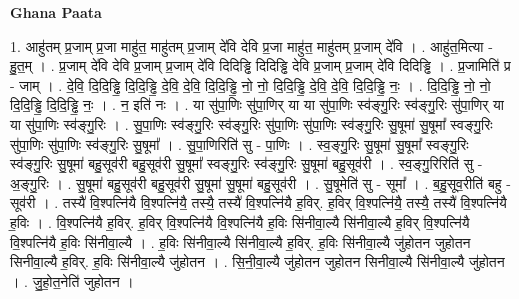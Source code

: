 \documentclass[17pt]{extarticle}
\begin{document}
\textbf{Ghana Paata } \newline

1. आहु॑तम् प्र॒जाम् प्र॒जा माहु॑त॒ माहु॑तम् प्र॒जाम् दे॑वि देवि प्र॒जा माहु॑त॒ माहु॑तम् प्र॒जाम् दे॑वि । . आहु॑त॒मित्या - हु॒त॒म् । . प्र॒जाम् दे॑वि देवि प्र॒जाम् प्र॒जाम् दे॑वि दिदिड्ढि दिदिड्ढि देवि प्र॒जाम् प्र॒जाम् दे॑वि दिदिड्ढि । . प्र॒जामिति॑ प्र - जाम् । . दे॒वि॒ दि॒दि॒ड्ढि॒ दि॒दि॒ड्ढि॒ दे॒वि॒ दे॒वि॒ दि॒दि॒ड्ढि॒ नो॒ नो॒ दि॒दि॒ड्ढि॒ दे॒वि॒ दे॒वि॒ दि॒दि॒ड्ढि॒ नः॒ । . दि॒दि॒ड्ढि॒ नो॒ नो॒ दि॒दि॒ड्ढि॒ दि॒दि॒ड्ढि॒ नः॒ । . न॒ इति॑ नः । . या सु॑पा॒णिः सु॑पा॒णिर् या या सु॑पा॒णिः स्व॑ङ्गु॒रिः स्व॑ङ्गु॒रिः सु॑पा॒णिर् या या सु॑पा॒णिः स्व॑ङ्गु॒रिः । . सु॒पा॒णिः स्व॑ङ्गु॒रिः स्व॑ङ्गु॒रिः सु॑पा॒णिः सु॑पा॒णिः स्व॑ङ्गु॒रिः सु॒षूमा॑ सु॒षूमा᳚ स्वङ्गु॒रिः सु॑पा॒णिः सु॑पा॒णिः स्व॑ङ्गु॒रिः सु॒षूमा᳚ । . सु॒पा॒णिरिति॑ सु - पा॒णिः । . स्व॒ङ्गु॒रिः सु॒षूमा॑ सु॒षूमा᳚ स्वङ्गु॒रिः स्व॑ङ्गु॒रिः सु॒षूमा॑ बहु॒सूव॑री बहु॒सूव॑री सु॒षूमा᳚ स्वङ्गु॒रिः स्व॑ङ्गु॒रिः सु॒षूमा॑ बहु॒सूव॑री । . स्व॒ङ्गु॒रिरिति॑ सु - अ॒ङ्गु॒रिः । . सु॒षूमा॑ बहु॒सूव॑री बहु॒सूव॑री सु॒षूमा॑ सु॒षूमा॑ बहु॒सूव॑री । . सु॒षूमेति॑ सु - सूमा᳚ । . ब॒हु॒सूव॒रीति॑ बहु - सूव॑री । . तस्यै॑ वि॒श्पत्नि॑यै वि॒श्पत्नि॑यै॒ तस्यै॒ तस्यै॑ वि॒श्पत्नि॑यै ह॒विर्. ह॒विर् वि॒श्पत्नि॑यै॒ तस्यै॒ तस्यै॑ वि॒श्पत्नि॑यै ह॒विः । . वि॒श्पत्नि॑यै ह॒विर्. ह॒विर् वि॒श्पत्नि॑यै वि॒श्पत्नि॑यै ह॒विः सि॑नीवा॒ल्यै सि॑नीवा॒ल्यै ह॒विर् वि॒श्पत्नि॑यै वि॒श्पत्नि॑यै ह॒विः सि॑नीवा॒ल्यै । . ह॒विः सि॑नीवा॒ल्यै सि॑नीवा॒ल्यै ह॒विर्. ह॒विः सि॑नीवा॒ल्यै जु॑होतन जुहोतन सिनीवा॒ल्यै ह॒विर्. ह॒विः सि॑नीवा॒ल्यै जु॑होतन । . सि॒नी॒वा॒ल्यै जु॑होतन जुहोतन सिनीवा॒ल्यै सि॑नीवा॒ल्यै जु॑होतन । . जु॒हो॒त॒नेति॑ जुहोतन । \newline
\end{document}
